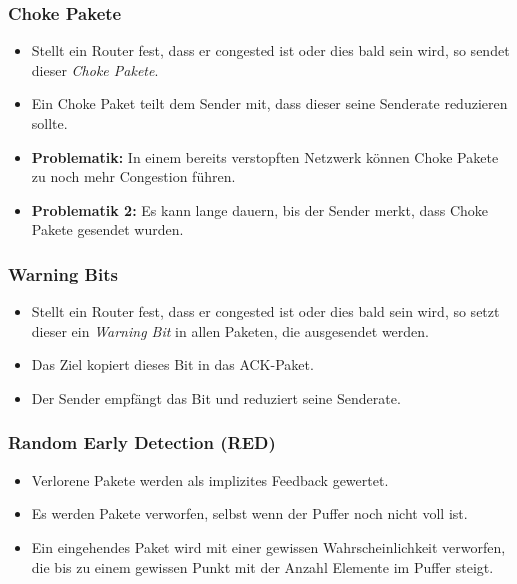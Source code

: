 \documentclass[a4paper, 11pt, accentcolor = tud3b]{tudreport}
\begin{document}
                \subsubsection{Choke Pakete}
                    \begin{itemize}
                    	\item Stellt ein Router fest, dass er congested ist oder dies bald sein wird, so sendet dieser \textit{Choke Pakete}.
                    	\item Ein Choke Paket teilt dem Sender mit, dass dieser seine Senderate reduzieren sollte.
                    	\item \textbf{Problematik:} In einem bereits verstopften Netzwerk können Choke Pakete zu noch mehr Congestion führen.
                    	\item \textbf{Problematik 2:} Es kann lange dauern, bis der Sender merkt, dass Choke Pakete gesendet wurden.
                    \end{itemize}

                \subsubsection{Warning Bits}
                    \begin{itemize}
                    	\item Stellt ein Router fest, dass er congested ist oder dies bald sein wird, so setzt dieser ein \textit{Warning Bit} in allen Paketen, die ausgesendet werden.
                    	\item Das Ziel kopiert dieses Bit in das ACK-Paket.
                    	\item Der Sender empfängt das Bit und reduziert seine Senderate.
                    \end{itemize}

                \subsubsection{Random Early Detection (RED)}
	                \begin{itemize}
	                	\item Verlorene Pakete werden als implizites Feedback gewertet.
	                	\item Es werden Pakete verworfen, selbst wenn der Puffer noch nicht voll ist.
	                	\item Ein eingehendes Paket wird mit einer gewissen Wahrscheinlichkeit verworfen, die bis zu einem gewissen Punkt mit der Anzahl Elemente im Puffer steigt.
	                \end{itemize}
\end{document}
